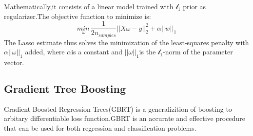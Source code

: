 \documentclass[10pt,a4paper]{ctexart}
\begin{document}
    Mathematically,it consists of a linear model trained with $\mathcal{l}_1$ prior as regularizer.The objective function to minimize is:
    \begin{equation*}
    	\underset{\omega}{min\,}{\dfrac{1}{2n_{samples}}||X\omega-y||_2^2}+\alpha||w||_1
    \end{equation*}
    The Lasso estimate thus solves the minimization of the least-squares penalty with $\alpha||\omega||_1$ added,
    where $\alpha$is a constant and $||\omega||_1$is the $\mathcal{l}_1$-norm of the parameter vector.
    \subsection{Gradient Tree Boosting}
    Gradient Boosted Regression Trees(GBRT) is a generalizition of boosting to arbitary
    differentiable loss function.GBRT is an accurate and effective  procedure that can be used for 
    both regression and classification problems.
\end{document}
